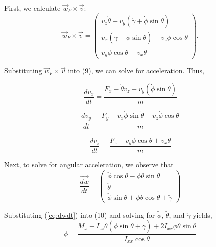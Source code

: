 \documentclass[a4paper,12pt, oneside]{article}
\newcommand{\blue}[1]{\textcolor{blue}{#1}}
\begin{document}

First, we calculate $\vec{w}_F\times\vec{v}$: 
\begin{equation*}
\vec{w}_F\times\vec{v}=\left(\begin{array}{ccc} v_z\dot\theta-v_y(\dot\gamma+\dot\phi\sin\theta) \\ v_x(\dot\gamma+\dot\phi\sin\theta)-v_z\dot\phi\cos\theta \\ v_y\dot\phi\cos\theta-v_x\dot\theta\end{array}\right).
\end{equation*}

Substituting $\vec{w}_F\times\vec{v}$ into (9), we can solve for acceleration. Thus,

\begin{equation}
\frac{{dv}_x}{dt}=\frac{{F}_x-\dot\theta v_z+v_y(\dot\phi\sin\theta)}{m}
\end{equation}

\begin{equation}
\frac{{dv}_y}{dt}=\frac{F_y-v_x\dot\phi\sin\dot\theta+v_z\dot\phi\cos\theta}{m}
\end{equation}

\begin{equation}
\frac{{dv}_z}{dt}=\frac{F_z-v_y\dot\phi\cos\theta+v_x\dot\theta}{m}
\end{equation}

Next, to solve for angular acceleration, we observe that 
\begin{equation}
  \label{eq:dwdt}
\frac{\vec{dw}}{dt}=\left(\begin{array}{ccc}\ddot\phi\cos\theta-\dot\phi\dot\theta\sin\theta\\ \ddot\theta \\ \ddot\phi\sin\theta + \dot\phi\dot\theta\cos\theta+\ddot\gamma\end{array} \right)
\end{equation}

Substituting (\ref{eq:dwdt}) into (10) and solving for $\ddot\phi$, $\ddot\theta$, and $\ddot\gamma$ yields,
\begin{equation}
\ddot\phi=\frac{M_x-I_{zz}\dot\theta(\dot\phi\sin\theta+\dot\gamma)+2I_{xx}\dot\phi\dot\theta\sin\theta}{I_{xx}\cos\theta}
\end{equation}
\end{document}

